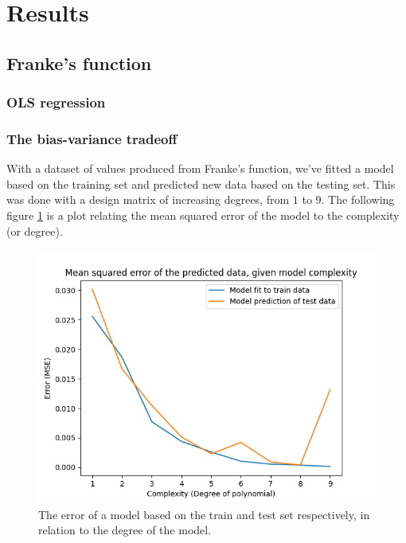 \documentclass[../main.tex]{subfiles}
\begin{document}
\section{Results}\label{sec:results}
\subsection{Franke's function}

\subsubsection{OLS regression}
\subsubsection{The bias-variance tradeoff}
With a dataset of values produced from Franke's function, we've fitted a model based on the training set and predicted new data based on the testing set. This was done with a design matrix of increasing degrees, from $1$ to $9$. The following figure \ref{fig:result_complexity} is a plot relating the mean squared error of the model to the complexity (or degree).

\begin{figure}[h]
    \centering
    \includegraphics[width=\textwidth]{../assets/complexity.png}
    \caption{The error of a model based on the train and test set respectively, in relation to the degree of the model.}
    \label{fig:result_complexity}
\end{figure}

\end{document}
